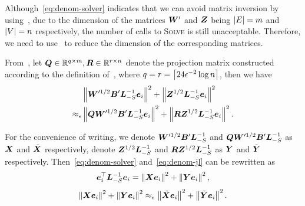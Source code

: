 \documentclass[sigconf]{acmart}
\begin{document}
Although~\eqref{eq:denom-solver} indicates that we can avoid matrix inversion by using~, due to the dimension of the matrices \(\boldsymbol{W}'\) and \(\boldsymbol{Z}\) being \(\left|E \right|=m\) and \(\left|V \right|=n\) respectively, the number of calls to \textsc{Solve} is still unacceptable.
Therefore, we need to use~ to reduce the dimension of the corresponding matrices.

From~, let \(\boldsymbol{Q}\in\mathbb{R}^{q\times m},\boldsymbol{R}\in\mathbb{R}^{r\times n}\) denote the projection matrix constructed according to the definition of~, where \(q=r=\left\lceil24\epsilon^{-2}\log n\right\rceil\), then we have
\begin{equation}\label{eq:denom-jl}
    \begin{split}
        &\left\Vert\boldsymbol{W}'^{1/2}\boldsymbol{B}'\boldsymbol{L}_{-S}^{-1}\boldsymbol{e}_i\right\Vert^2+\left\Vert\boldsymbol{Z}^{1/2}\boldsymbol{L}_{-S}^{-1}\boldsymbol{e}_i\right\Vert^2\\
        \approx_\epsilon&\left\Vert\boldsymbol{Q}\boldsymbol{W}'^{1/2}\boldsymbol{B}'\boldsymbol{L}_{-S}^{-1}\boldsymbol{e}_i\right\Vert^2+\left\Vert\boldsymbol{R}\boldsymbol{Z}^{1/2}\boldsymbol{L}_{-S}^{-1}\boldsymbol{e}_i\right\Vert^2.
    \end{split}
\end{equation}

For the convenience of writing, we denote \(\boldsymbol{W}'^{1/2}\boldsymbol{B}'\boldsymbol{L}_{-S}^{-1}\) and \(\boldsymbol{Q}\boldsymbol{W}'^{1/2}\boldsymbol{B}'\boldsymbol{L}_{-S}^{-1}\) as \(\boldsymbol{X}\) and \(\tilde{\boldsymbol{X}}\) respectively, denote \(\boldsymbol{Z}^{1/2}\boldsymbol{L}_{-S}^{-1}\) and \(\boldsymbol{R}\boldsymbol{Z}^{1/2}\boldsymbol{L}_{-S}^{-1}\) as \(\boldsymbol{Y}\) and \(\tilde{\boldsymbol{Y}}\) respectively.
Then~\eqref{eq:denom-solver} and~\eqref{eq:denom-jl} can be rewritten as
\begin{equation}\label{eq:denom-solver-simp}
    \boldsymbol{e}_i^\top\boldsymbol{L}_{-S}^{-1}\boldsymbol{e}_i=\left\Vert\boldsymbol{X}\boldsymbol{e}_i\right\Vert^2+\left\Vert\boldsymbol{Y}\boldsymbol{e}_i\right\Vert^2,
\end{equation}
\begin{equation}\label{eq:denom-jl-simp}
    \left\Vert\boldsymbol{X}\boldsymbol{e}_i\right\Vert^2+\left\Vert\boldsymbol{Y}\boldsymbol{e}_i\right\Vert^2\approx_\epsilon\left\Vert\tilde{\boldsymbol{X}}\boldsymbol{e}_i\right\Vert^2+\left\Vert\tilde{\boldsymbol{Y}}\boldsymbol{e}_i\right\Vert^2.
\end{equation}
\end{document}
